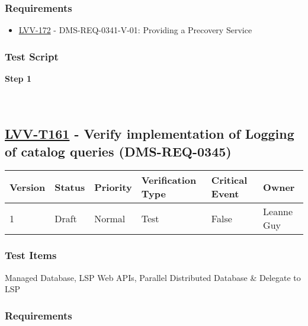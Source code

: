 \hypertarget{requirements-60}{%
\subsubsection{Requirements}\label{requirements-60}}

\begin{itemize}
\tightlist
\item
  \href{https://jira.lsstcorp.org/browse/LVV-172}{LVV-172} -
  DMS-REQ-0341-V-01: Providing a Precovery Service
\end{itemize}

\hypertarget{test-script-60}{%
\subsubsection{Test Script}\label{test-script-60}}

\textbf{Step 1}\\
~\\
~\\

\hypertarget{lvv-t161---verify-implementation-of-logging-of-catalog-queries-dms-req-0345}{%
\subsection{\texorpdfstring{\href{https://jira.lsstcorp.org/secure/Tests.jspa\#/testCase/LVV-T161}{LVV-T161}
- Verify implementation of Logging of catalog queries
(DMS-REQ-0345)}{LVV-T161 - Verify implementation of Logging of catalog queries (DMS-REQ-0345)}}\label{lvv-t161---verify-implementation-of-logging-of-catalog-queries-dms-req-0345}}

\begin{longtable}[]{@{}llllll@{}}
\toprule
Version & Status & Priority & Verification Type & Critical Event &
Owner\tabularnewline
\midrule
\endhead
1 & Draft & Normal & Test & False & Leanne Guy\tabularnewline
\bottomrule
\end{longtable}

\hypertarget{test-items-61}{%
\subsubsection{Test Items}\label{test-items-61}}

Managed Database, LSP Web APIs, Parallel Distributed Database \&
Delegate to LSP

\hypertarget{requirements-61}{%
\subsubsection{Requirements}\label{requirements-61}}

